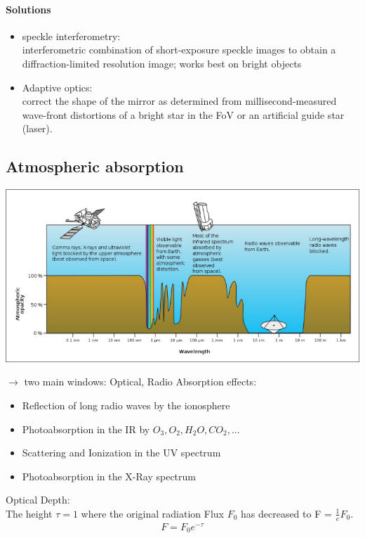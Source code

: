 \documentclass[11pt,a4paper]{article}
\begin{document}
\paragraph{Solutions}
\begin{itemize}
    \item speckle interferometry:  \\ 
        interferometric combination of short-exposure speckle images to obtain a diffraction-limited resolution image; works best on bright objects
    \item Adaptive optics: \\ 
        correct the shape of the mirror as determined from millisecond-measured
wave-front distortions of a bright star in the FoV or an artificial guide star (laser).
\end{itemize}
\subsection{Atmospheric absorption}
\begin{center}
    \includegraphics[width=\linewidth]{screenshot_2024-01-12-190242.png}
\end{center}
$\rightarrow$ two main windows: Optical, Radio
Absorption effects:
\begin{itemize}
    \item Reflection of long radio waves by the ionosphere 
    \item Photoabsorption in the IR by $O_3, O_2, H_2 O, CO_2,...$
    \item Scattering and Ionization in the UV spectrum
    \item Photoabsorption in the X-Ray spectrum
\end{itemize}
Optical Depth: \\ 
The height $\tau = 1$ where the original radiation Flux $F_0$ has decreased to F = $\frac 1 e F_0$.
\begin{align*}
    F = F_0e^{-\tau} 
\end{align*}
\end{document}
